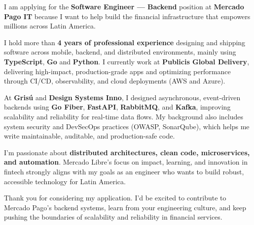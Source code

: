 \documentclass[11pt,a4paper]{awesome-cv}
\begin{document}
\makecvheader[R]
\makelettertitle

\begin{cvletter}

I am applying for the \textbf{Software Engineer — Backend} position at \textbf{Mercado Pago IT} because I want to help build the financial infrastructure that empowers millions across Latin America.  

I hold more than \textbf{4 years of professional experience} designing and shipping software across mobile, backend, and distributed environments, mainly using \textbf{TypeScript}, \textbf{Go} and \textbf{Python}. I currently work at \textbf{Publicis Global Delivery}, delivering high-impact, production-grade apps and optimizing performance through CI/CD, observability, and cloud deployments (AWS and Azure).

At \textbf{Grisú} and \textbf{Design Systems Inno}, I designed asynchronous, event-driven backends using \textbf{Go Fiber}, \textbf{FastAPI}, \textbf{RabbitMQ}, and \textbf{Kafka}, improving scalability and reliability for real-time data flows. My background also includes system security and DevSecOps practices (OWASP, SonarQube), which helps me write maintainable, auditable, and production-safe code.  

I’m passionate about \textbf{distributed architectures, clean code, microservices, and automation}. Mercado Libre’s focus on impact, learning, and innovation in fintech strongly aligns with my goals as an engineer who wants to build robust, accessible technology for Latin America.  

Thank you for considering my application. I’d be excited to contribute to Mercado Pago’s backend systems, learn from your engineering culture, and keep pushing the boundaries of scalability and reliability in financial services.

\end{cvletter}

\makeletterclosing
\end{document}
